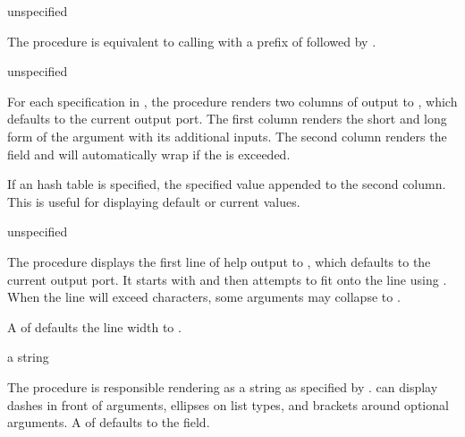\begin{procedure}
\end{procedure}
\returns{} unspecified

The  procedure is equivalent to calling
 with a prefix of  followed by
.

\begin{procedure}
\end{procedure}
\returns{} unspecified

For each specification in , the 
procedure renders two columns of output to , which defaults to
the current output port. The first column renders the short and long
form of the argument with its additional inputs. The second column
renders the   field and will automatically
wrap if the  is exceeded.

If an  hash table is specified, the specified value appended
to the second column. This is useful for displaying default or current
values.

\begin{procedure}
\end{procedure}
\returns{} unspecified

The  procedure displays the first line of help
output to , which defaults to the current output port. It
starts with  and  then attempts to fit
 onto the line using . When the line will
exceed  characters, some arguments may collapse to
\code{[options]}.

A  of  defaults the line width to
.

\begin{procedure}
\end{procedure}
\returns{} a string

The  procedure is responsible rendering 
as a string as specified by .   can display
dashes in front of arguments, ellipses on list types, and brackets
around optional arguments. A  of  defaults to the
  field.

